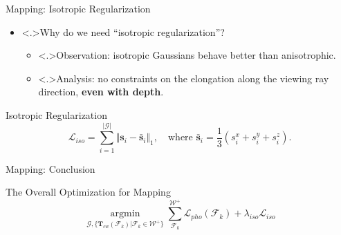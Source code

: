 \begin{Frame}{Mapping: Isotropic Regularization}
	\begin{itemize}
		\setlength{\itemsep}{1.5ex}
		\item<+-> \alert<.>{Why} do we need ``isotropic regularization''?
			\vspace*{1.5ex}
			\begin{itemize}
				\setlength{\itemsep}{1.5ex}
				\item<+-> \alert<.>{Observation:} isotropic Gaussians behave better than anisotrophic.
				\item<+-> \alert<.>{Analysis:} no constraints on the elongation along the viewing ray direction, \textbf{even with depth}.
			\end{itemize}
	\end{itemize}
	\vspace*{\fill}
	\begin{block}{Isotropic Regularization}
		\vspace*{0.5ex}
		\begin{equation}
			\mathcal{L}_{iso} = \sum_{i=1}^{\vert \mathcal{G} \vert} \Vert \mathbf{s}_i - \bar{\mathbf{s}}_i \Vert_1, \quad\text{where } \bar{\mathbf{s}}_i = \frac{1}{3} \left( s_i^{x} + s_i^{y} + s_i^{z} \right).
		\end{equation}
	\end{block}
\end{Frame}

\begin{Frame}{Mapping: Conclusion}
	\begin{block}{The Overall Optimization for Mapping}
		\begin{equation}
			\underset{\mathcal{G}, \{\mathbf{T}_{cw}({\mathcal{F}_k})\vert \mathcal{F}_k\in \mathcal{W}^{+}\}}{\operatorname{argmin}} \sum_{\mathcal{F}_k}^{\mathcal{W}^{+}} \mathcal{L}_{pho}\left({\mathcal{F}_k}\right) + \lambda_{iso} \mathcal{L}_{iso}
		\end{equation}
	\end{block}
\end{Frame}
